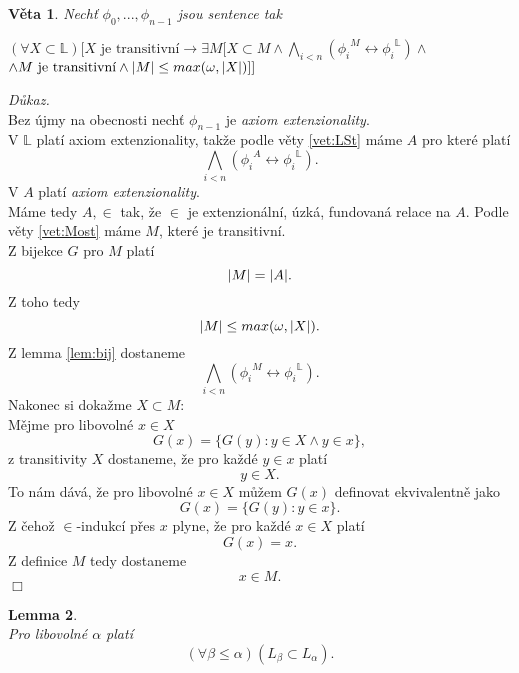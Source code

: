 \documentclass[12pt,a4paper]{article}
\newtheorem{veta}{V\v{e}ta}[section]%
\newtheorem{lemma}[veta]{Lemma}
\newenvironment{proof}
{\noindent \textit{D\r{u}kaz.}}
{\hspace*{\fill} $\Box$}
\begin{document}
\begin{veta}
\label{vet:konstrukce}
Nech\v{t} $\phi_0,...,\phi_{n-1}$ jsou sentence tak
\begin{center}
$ (\forall X \subset \mathbb{L})[ X \text{ je transitivn\'{i}} \rightarrow \exists M [ X \subset M \wedge \bigwedge_{i<n}({\phi_i}^M \leftrightarrow {\phi_i}^\mathbb{L})\wedge $ $ \wedge M \text{ je transitivn\'{i}} \wedge \arrowvert M \arrowvert \leq max(\omega,\arrowvert X\arrowvert)]]  $
\end{center}
\end{veta}
\begin{proof}~\\
Bez \'{u}jmy na obecnosti nech\v{t} $ \phi_{n-1} $ je\textit{ axiom extenzionality}.\\ V $ \mathbb{L} $ plat\'{i} axiom extenzionality, tak\v{z}e podle v\v{e}ty \ref{vet:LSt} m\'{a}me $ A $ pro kter\'{e} plat\'{i} 
\[ \bigwedge_{i<n}({\phi_i}^A \leftrightarrow {\phi_i}^\mathbb{L}) .\] 
V $ A $  plat\'{i} \textit{axiom extenzionality}. \\ M\'{a}me tedy $ A,\in $ tak, \v{z}e $ \in $ je extenzion\'{a}ln\'{i}, \'{u}zk\'{a}, fundovan\'{a} relace na $ A $. 
Podle v\v{e}ty \ref{vet:Most} m\'{a}me $ M $, kter\'{e} je transitivn\'{i}.\\ Z bijekce $ G $ pro $ M $ plat\'{i} \[ \arrowvert M \arrowvert=\arrowvert A \arrowvert .\] Z toho tedy
\[ \arrowvert M \arrowvert \leq max(\omega,\arrowvert X\arrowvert). \]
Z lemma \ref{lem:bij} dostaneme 
\[ \bigwedge_{i<n}({\phi_i}^M \leftrightarrow {\phi_i}^\mathbb{L}) .\] 
Nakonec si doka\v{z}me $ X \subset M $:\\
M\v{e}jme pro libovoln\'{e} $ x \in X  $
\[ G(x)=\{G(y):y\in X \wedge y \in x \},\]
z transitivity $ X $ dostaneme, \v{z}e pro ka\v{z}d\'{e} $ y \in x $ plat\'{i} \[ y \in X .\] 
To n\'{a}m d\'{a}v\'{a}, \v{z}e pro libovoln\'{e} $ x \in X$ m\r{u}\v{z}em $ G(x) $ definovat ekvivalentn\v{e} jako 
\[ G(x)=\{G(y): y \in x \}. \] 
Z \v{c}eho\v{z} $ \in $-indukc\'{i} p\v{r}es $ x $ plyne, \v{z}e pro ka\v{z}d\'{e} $ x \in X $ plat\'{i} \[ G(x)=x .\]
Z definice $ M  $ tedy dostaneme 
\[ x \in M .\]
\end{proof}
\begin{lemma}~\\
\label{lem:subsetLem}
Pro libovoln\'{e} $ \alpha $ plat\'{i}
\[ (\forall \beta \leq \alpha) (L_\beta \subset L_\alpha). \]
\end{lemma}
\end{document}
